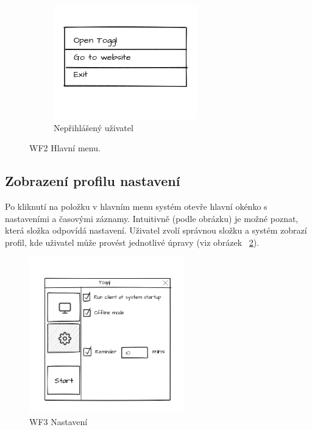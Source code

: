 \documentclass[thesis=B,czech]{FITthesis}[2012/06/26]
\begin{document}
\begin{figure}[!tbp]
\begin{subfigure}[h]{0.4\linewidth}
	\includegraphics[width=\linewidth]{wf_hm3.png}
	\caption{Nepřihlášený uživatel}
\end{subfigure}
	\caption{WF2 Hlavní menu.}
	\label{fig:wf_hm}
\end{figure}

\subsection{Zobrazení profilu nastavení}
Po kliknutí na položku  v hlavním menu systém otevře hlavní okénko s nastaveními a časovými záznamy. Intuitivně (podle obrázku) je možné poznat, která složka odpovídá nastavení. Uživatel zvolí správnou složku a systém zobrazí profil, kde uživatel může provést jednotlivé úpravy (viz obrázek ~\ref{fig:wf_set}). 

 \begin{figure}[h]\centering
	\includegraphics[width=0.6\textwidth]{wf_set.png}
	\caption[WF3 Nastavení.]{WF3 Nastavení}\label{fig:wf_set}
\end{figure}
\end{document}
